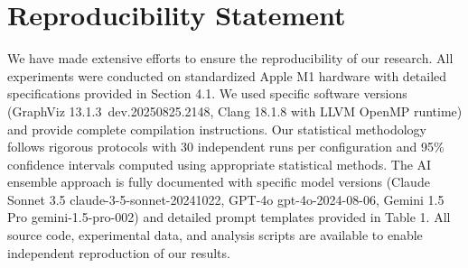 \section*{Reproducibility Statement}

We have made extensive efforts to ensure the reproducibility of our research. All experiments were conducted on standardized Apple M1 hardware with detailed specifications provided in Section 4.1. We used specific software versions (GraphViz 13.1.3~dev.20250825.2148, Clang 18.1.8 with LLVM OpenMP runtime) and provide complete compilation instructions. Our statistical methodology follows rigorous protocols with 30 independent runs per configuration and 95\% confidence intervals computed using appropriate statistical methods. The AI ensemble approach is fully documented with specific model versions (Claude Sonnet 3.5 claude-3-5-sonnet-20241022, GPT-4o gpt-4o-2024-08-06, Gemini 1.5 Pro gemini-1.5-pro-002) and detailed prompt templates provided in Table 1. All source code, experimental data, and analysis scripts are available to enable independent reproduction of our results. 
